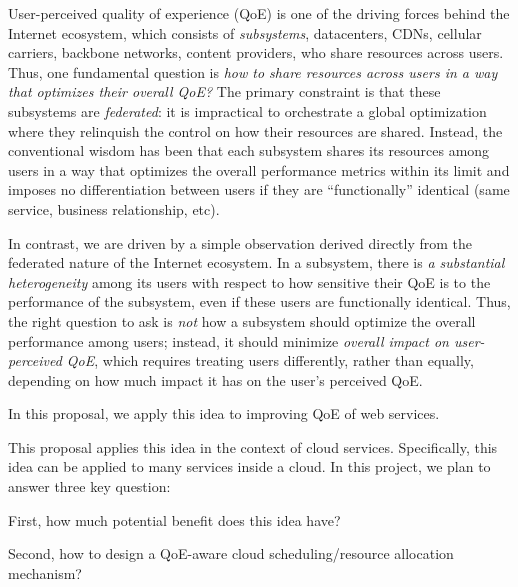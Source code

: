 User-perceived quality of experience (QoE) is one of the driving forces behind the Internet ecosystem, which consists of {\em subsystems}, \eg datacenters, CDNs, cellular carriers, backbone networks, content providers, who share resources across users. 
Thus, one fundamental question is {\em how to share resources across users in a way that optimizes their overall QoE?}
The primary constraint is that these subsystems are {\em federated}: it is impractical to orchestrate a global optimization where they relinquish the control on how their resources are shared. 
Instead, the conventional wisdom has been that each subsystem shares its resources among users in a way that optimizes the overall performance metrics within its limit and imposes no differentiation between users if they are ``functionally'' identical (\ie same service, business relationship, etc).

In contrast, we are driven by a simple observation derived directly from the federated nature of the Internet ecosystem.
In a subsystem, there is {\em a substantial heterogeneity} among its users with respect to how sensitive their QoE is to the performance of the subsystem, even if these users are functionally identical. 
Thus, the right question to ask is {\em not} how a subsystem should optimize the overall performance among users; instead, it should minimize {\em overall impact on user-perceived QoE}, which requires treating users differently, rather than equally, depending on how much impact it has on the user's perceived QoE.

In this proposal, we apply this idea to improving QoE of web services.


This proposal applies this idea in the context of cloud services. 
Specifically, this idea can be applied to many services inside a cloud. 
In this project, we plan to answer three key question:

First, how much potential benefit does this idea have?

Second, how to design a QoE-aware cloud scheduling/resource allocation mechanism?

